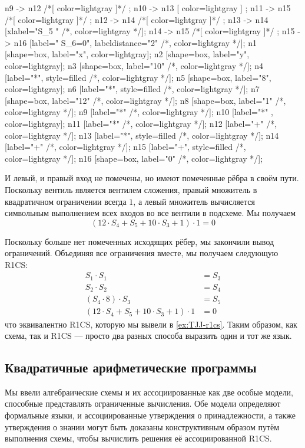 \begin{example}
\begin{center}
{	n9 -> n12 /*[ color=lightgray ]*/ ;
	n10 -> n13 [ color=lightgray ] ; 
	n11 -> n15 /*[ color=lightgray ]*/ ;
	n12 -> n14 /*[ color=lightgray ]*/ ;	
	n13 -> n14 [xlabel="S_5  "  /*, color=lightgray */];
	n14 -> n15 /*[ color=lightgray ]*/ ;
	n15 -> n16 [label="  S_6=0", labeldistance="2" /*, color=lightgray */];
	n1 [shape=box, label="x", color=lightgray];
	n2 [shape=box, label="y", color=lightgray];
	n3 [shape=box, label="10" /*, color=lightgray */];
	n4 [label="*", style=filled /*, color=lightgray */];
	n5 [shape=box, label="8", color=lightgray];
	n6 [label="*", style=filled /*, color=lightgray */];
	n7 [shape=box, label="12" /*, color=lightgray */];
	n8 [shape=box, label="1" /*, color=lightgray */];
	n9 [label="*" /*, color=lightgray */];
	n10 [label="*" , color=lightgray];
	n11 [label="*" /*, color=lightgray */];	
	n12 [label="+" /*, color=lightgray */];	
	n13 [label="*", style=filled /*, color=lightgray */];
	n14 [label="+" /*, color=lightgray */];
	n15 [label="+", style=filled /*, color=lightgray */];
	n16 [shape=box, label="0" /*, color=lightgray */];		
}
\end{center}
И левый, и правый вход не помечены, но имеют помеченные рёбра в своём пути. Поскольку вентиль является вентилем сложения, правый множитель в квадратичном ограничении всегда $1$, а левый множитель вычисляется символьным выполнением всех входов во все вентили в подсхеме. Мы получаем
$$
(12\cdot S_4 + S_5 + 10\cdot S_3 + 1)\cdot 1 = 0
$$

Поскольку больше нет помеченных исходящих рёбер, мы закончили вывод ограничений. Объединяя все ограничения вместе, мы получаем следующую R1CS:
\begin{align*}
 S_1 \cdot S_1 &= S_3\\
 S_2 \cdot S_2 &= S_4\\
 (S_4\cdot 8)\cdot S_3 &= S_5\\
 (12\cdot S_4 + S_5 + 10\cdot S_3 + 1)\cdot 1 &= 0
\end{align*}
что эквивалентно R1CS, которую мы вывели в \examplename{} \ref{ex:TJJ-r1cs}. Таким образом, как схема, так и R1CS — просто два разных способа выразить один и тот же язык.
\end{example}
\subsection{Квадратичные арифметические программы}
\label{sec:QAP}
 Мы ввели алгебраические схемы и их ассоциированные  как две особые модели, способные представлять ограниченные вычисления. Обе модели определяют формальные языки, и ассоциированные утверждения о принадлежности, а также утверждения о знании могут быть доказаны конструктивным образом путём выполнения схемы, чтобы вычислить решения её ассоциированной R1CS.

